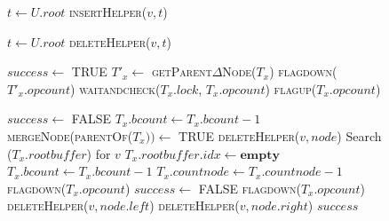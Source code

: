 \begin{figure}
\centering
\begin{algorithmic}[1]
\small

 
\State $t \gets U.root$
\State \Return \textsc{insertHelper}($v,t$)
\EndFunction
\State

 
\State $t \gets U.root$
\State \Return \textsc{deleteHelper}($v,t$)
\EndFunction
\State

\State $success \gets$ TRUE
                 			                                                 
   \State  $T'_x \gets$ \textsc{getParent$\Delta$Node}($T_x$)
   \State  \textsc{flagdown}($T'_x.opcount$) 				
   \State  \textsc{waitandcheck}($T_x.lock$, $T_x.opcount$)
   \State  \textsc{flagup}($T_x.opcount$)
\EndIf

 			
                          	\label{lst:line:markdel}       
                	\State $success \gets$ FALSE                                           		 
            \Else	
             	 	\label{lst:line:markdel-check} 
			\State $T_x.bcount \gets T_x.bcount - 1 $	
                		\State \textsc{mergeNode}(\textsc{parentOf}($T_x)) \gets$ TRUE                       
		\Else		 
			\State \textsc{deleteHelper}($v, node$)	 		
		\EndIf
            \EndIf
        \Else												
        	\State Search ($T_{x}.rootbuffer$) for $v$
                 		\State $T_{x}.rootbuffer.idx \gets \textbf{empty}$	\label{lst:line:bufdel} 
				\State $T_x.bcount\gets T_x.bcount - 1$
        			\State $T_x.countnode\gets T_x.countnode - 1$
            	\Else	
			\State \textsc{flagdown}($T_x.opcount$)
            		\State $success \gets$ FALSE					
	    	\EndIf                                             
    	\EndIf
	\State \textsc{flagdown}($T_x.opcount$)
\Else {}
        \State \textsc{deleteHelper}($v, node.left$)
\Else
        \State \textsc{deleteHelper}($v, node.right$)
\EndIf
\EndIf
\State \Return $success$
\EndFunction

\end{algorithmic}
\end{figure}

